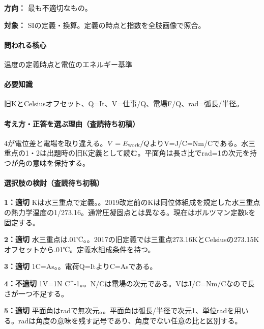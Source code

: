 \noindent\textbf{方向：} 最も不適切なもの。\par

\noindent\textbf{対象：} SIの定義・換算。定義の時点と指数を全肢画像で照合。\par

\paragraph{問われる核心} 温度の定義時点と電位のエネルギー基準

\paragraph{必要知識} 旧KとCelsiusオフセット、Q=\allowbreak{}It、V=仕事/Q、電場F/Q、rad=弧長/半径。

\paragraph{考え方・正答を選ぶ理由（査読待ち初稿）} 4が電位差と電場を取り違える。\(V=E_{\rm work}/Q\)よりV=\allowbreak{}J/C=\allowbreak{}Nm/Cである。水三重点の1・2は出題時の旧K定義として読む。平面角は長さ比でrad=\allowbreak{}1の次元を持つが角の意味を保持する。

\paragraph{選択肢の検討（査読待ち初稿）}\mbox{}\par

\noindent\textbf{1：適切} Kは水三重点で定義。。2019改定前のKは同位体組成を規定した水三重点の熱力学温度の1/273.16。通常圧凝固点とは異なる。現在はボルツマン定数kを固定する。\par

\noindent\textbf{2：適切} 水三重点は.01℃。。2017の旧定義では三重点273.16KとCelsiusの273.15Kオフセットから.01℃。定義水組成条件を持つ。\par

\noindent\textbf{3：適切} 1C=\allowbreak{}As。。電荷Q=\allowbreak{}ItよりC=\allowbreak{}Asである。\par

\noindent\textbf{4：不適切} 1V=\allowbreak{}1N C\textasciicircum{}-1。。N/Cは電場の次元である。VはJ/C=\allowbreak{}Nm/Cなので長さが一つ不足する。\par

\noindent\textbf{5：適切} 平面角はradで無次元。。平面角は弧長/半径で次元1、単位radを用いる。radは角度の意味を残す記号であり、角度でない任意の比と区別する。\par

